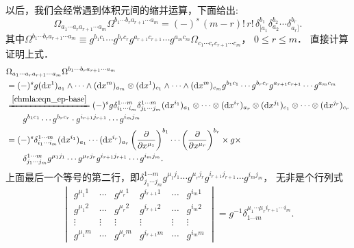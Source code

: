 以后，我们会经常遇到体积元间的缩并运算，下面给出:
\begin{equation}\label{chrg:eqn_VE-contract-VE}
    \boxed{
    \Omega_{a_1 \cdots a_r a_{r+1} \cdots a_m}\Omega^{{b_1 \cdots b_r} a_{r+1} \cdots a_m}
    = (-)^s \, (m-r)! \, r! \, \delta_{\lbrack a_1}^{b_1} \delta_{a_2}^{b_2}\cdots 
    \delta_{a_r \rbrack}^{b_r}   .  }
\end{equation}
其中$\Omega^{{b_1 \cdots b_r} a_{r+1} \cdots a_m}\equiv g^{b_{1}c_{1}} \cdots g^{b_{r}c_{r}}
g^{a_{r+1}c_{r+1}} \cdots g^{a_{m}c_{m}}\Omega_{c_1 \cdots c_r c_{r+1} \cdots c_m}$，
$0\leqslant r \leqslant m$．
直接计算证明上式．
\setlength{\mathindent}{0em}
\begin{align*}
    &\Omega_{a_1 \cdots a_r a_{r+1} \cdots a_m}
    \Omega^{{b_1 \cdots b_r} a_{r+1} \cdots a_m} \\
    &= (-)^s g ({\rm d}x^1)_{a_1} \wedge \cdots \wedge({\rm d}x^m)_{a_m}
    \otimes ({\rm d}x^1)_{c_1} \wedge \cdots \wedge({\rm d}x^m)_{c_m}
    g^{b_{1}c_{1}}\cdots g^{b_{r}c_{r}} g^{a_{r+1}c_{r+1}} \cdots g^{a_{m}c_{m}} \\
    &\xlongequal{\ref{chmla:eqn_ep-base}} (-)^s g
    \delta_{i_1 \cdots i_m}^{1 \cdots m} \delta_{j_1 \cdots j_m}^{1 \cdots m}
    ({\rm d}x^{i_{1}})_{a_{1}} \otimes \cdots \otimes ({\rm d}x^{i_r})_{a_r}  \otimes
    ({\rm d}x^{j_{1}})_{c_{1}} \otimes \cdots \otimes ({\rm d}x^{j_r})_{c_r}  \\
    &\qquad g^{b_{1}c_{1}}\cdots g^{b_{r}c_{r}} \cdot g^{i_{r+1}j_{r+1}} \cdots g^{i_{m}j_{m}} \\
    &= %
    (-)^s \delta_{i_1 \cdots i_m}^{1 \cdots m}
    ({\rm d}x^{i_{1}})_{a_{1}}  \cdots  ({\rm d}x^{i_r})_{a_r}
    \left(\frac{\partial }{\partial x^{\mu_1}}\right) ^{b_1} \cdots
    \left(\frac{\partial }{\partial x^{\mu_r}}\right) ^{b_r} \times g \times \\
    & \qquad  \delta_{j_1 \cdots j_m}^{1 \cdots m}
    g^{\mu_{1} j_{1}}\cdots g^{\mu_{r} j_{r}}  g^{i_{r+1}j_{r+1}} \cdots g^{i_{m}j_{m}} .
\end{align*}\setlength{\mathindent}{2em}
上面最后一个等号的第二行，即$\delta_{j_1 \cdots j_m}^{1 \cdots m}
g^{\mu_{1} j_{1}}\cdots g^{\mu_{r} j_{r}}  g^{i_{r+1}j_{r+1}} \cdots g^{i_{m}j_{m}} $，
无非是个行列式
\begin{equation}
    \begin{vmatrix}
        g^{\mu_{1} 1} & \cdots & g^{\mu_{r} 1} & g^{i_{r+1} 1} & \cdots & g^{i_{m} 1} \\
        g^{\mu_{1} 2} & \cdots & g^{\mu_{r} 2} & g^{i_{r+1} 2} & \cdots & g^{i_{m} 2} \\
        \vdots & \vdots & \vdots & \vdots & \vdots & \vdots \\
        g^{\mu_{1} m} & \cdots & g^{\mu_{r} m} & g^{i_{r+1} m} & \cdots & g^{i_{m} m}
    \end{vmatrix}
=g^{-1}\delta^{\mu_1 \cdots\mu_r i_{r+1}\cdots i_m}_{1 \cdots m} .
\end{equation}

